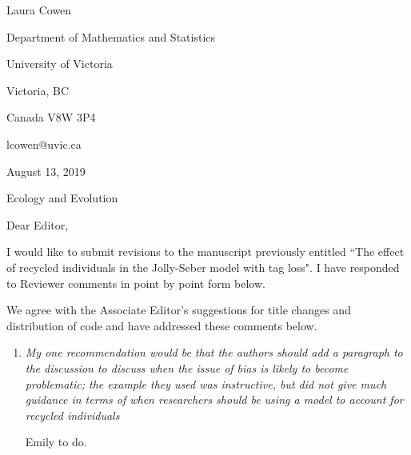 \documentclass[12pt]{article}
\begin{document}
\setlength{\textheight}{575pt} \setlength{\baselineskip}{23pt}

\noindent\tiny Laura Cowen

\noindent Department of Mathematics and Statistics

\noindent University of Victoria

\noindent Victoria, BC

\noindent Canada V8W 3P4

\noindent lcowen@uvic.ca

\bigskip

\bigskip

\noindent \normalsize August 13, 2019
\bigskip





\noindent Ecology and Evolution


\bigskip


\bigskip
\noindent Dear Editor,

\bigskip

I would like to submit revisions to the manuscript previously entitled ``The effect of recycled individuals in the Jolly-Seber model with tag loss".  I have responded to Reviewer comments in point by point form below. 

\bigskip


We agree with the Associate Editor's suggestions for title changes and distribution of code and have addressed these comments below.

\bigskip

\begin{enumerate}
\item  {\it My one recommendation would be that the authors should add a paragraph to the discussion to discuss when the issue of bias is likely to become problematic;  the example they used was instructive,   but did not give much guidance in terms of when researchers should be using a model to account for recycled individuals}

Emily to do.

\end{enumerate}
\end{document}
